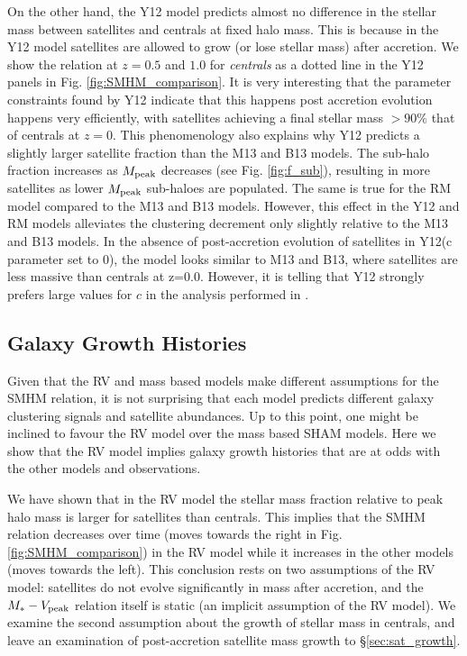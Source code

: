 \documentclass[a4paper,fleqn,usenatbib]{mnras}
\begin{document}
On the other hand, the Y12 model predicts almost no difference in the stellar mass between satellites and centrals at fixed halo mass.  This is because in the Y12 model satellites are allowed to grow (or lose stellar mass) after accretion.  We show the relation at $z=0.5$ and $1.0$ for {\em centrals} as a dotted line in the Y12 panels in Fig. \ref{fig:SMHM_comparison}.  It is very interesting that the parameter constraints found by Y12 indicate that this happens post accretion evolution happens very efficiently, with satellites achieving a final stellar mass $> 90\%$ that of centrals at $z=0$.  This phenomenology also explains why Y12 predicts a slightly larger satellite fraction than the M13 and B13 models.  The sub-halo fraction increases as $M_{\rm peak}$ decreases (see Fig. \ref{fig:f_sub}), resulting in more satellites as lower $M_{\rm peak}$ sub-haloes are populated.  The same is true for the RM model compared to the M13 and B13 models.  However, this effect in the Y12 and RM models alleviates the clustering decrement only slightly relative to the M13 and B13 models.  In the absence of post-accretion evolution of satellites in Y12(c parameter set to 0), the model looks similar to M13 and B13, where satellites are less massive than centrals at z=0.0.  However, it is telling that Y12 strongly prefers large values for $c$ in the analysis performed in \citet[][]{Yang:2012ew}.


\subsection{Galaxy Growth Histories}

Given that the RV and mass based models make different assumptions for the SMHM relation, it is not surprising that each model predicts different galaxy clustering signals and satellite abundances.  Up to this point, one might be inclined to favour the RV model over the mass based SHAM models.  Here we show that the RV model implies galaxy growth histories that are at odds with the other models and observations.

We have shown that in the RV model the stellar mass fraction relative to peak halo mass is larger for satellites than centrals.  This implies that the SMHM relation decreases over time (moves towards the right in Fig. \ref{fig:SMHM_comparison}) in the RV model while it increases in the other models (moves towards the left).  This conclusion rests on two assumptions of the RV model: satellites do not evolve significantly in mass after accretion, and the $M_* - V_{\rm peak}$ relation itself is static (an implicit assumption of the RV model).  We examine the second assumption about the growth of stellar mass in centrals, and leave an examination of post-accretion satellite mass growth to \S \ref{sec:sat_growth}.  
\end{document}
